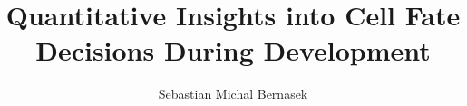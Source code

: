 \documentclass[12pt,reqno]{nuthesis}	%
\author{Sebastian Michal Bernasek}
\title{Quantitative Insights into Cell Fate Decisions During Development}
\begin{document}
%
%


\frontmatter		%

\maketitle		%

\copyrightpage		%

\abstract       %




\acknowledgements	%




\clearpage{} %
\tableofcontents	%

\clearpage{} %
\listoftables		%

\clearpage{} %
\listoffigures		%

\mainmatter             




%
%
%

%

%
\begin{singlespace}
\bibsep 12pt


\end{singlespace}

\appendix


\end{document}
